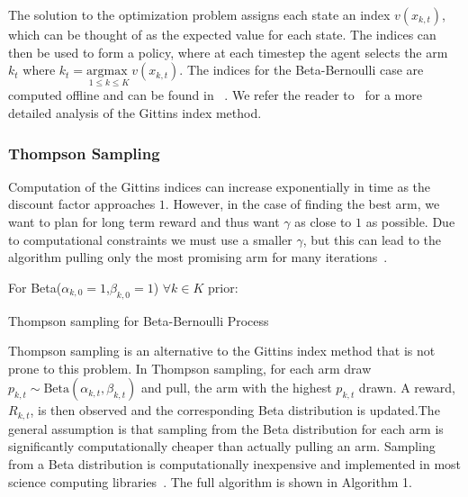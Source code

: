 \documentclass[10pt, conference]{ieeeconf}      %
\begin{document}
The solution to the optimization problem assigns each state an index $v(x_{k,t})$, which can be thought of as the expected value for each state. 
The indices can then be used to form a policy, where at each timestep the agent selects the arm $k_t$ where $k_t= \underset{1 \leq k \leq K}{\mbox{argmax }} v(x_{k,t})$.  The indices for the Beta-Bernoulli case are computed offline and can be found in ~\cite{gittins2011multi}.
We refer the reader to~\cite{gittins2011multi} for a more detailed analysis of the Gittins index method.
 

\subsubsection{Thompson Sampling}
Computation of the Gittins indices can increase exponentially in time as the discount factor approaches $1$.
However, in the case of finding the best arm, we want to plan for long term reward and thus want $\gamma$ as close to $1$ as possible.
Due to computational constraints we must use a smaller $\gamma$, but this can lead to the algorithm pulling only the most promising arm for many iterations~\cite{kelly1981multi}.

\begin{algorithm}
 For Beta($\alpha_{k,0}=1$,$\beta_{k,0}=1$) $\forall k \in K$ prior: \\
 \caption{Thompson sampling for Beta-Bernoulli Process}
\end{algorithm}

Thompson sampling is an alternative to the Gittins index method that is not prone to this problem. 
In Thompson sampling, for each arm draw $p_{k,t} \sim \mbox{Beta}(\alpha_{k,t},\beta_{k,t})$ and pull, the arm with the highest $p_{k,t}$ drawn.
A reward, $R_{k,t}$, is then observed and the corresponding Beta distribution is updated.The general assumption is that sampling from the Beta distribution for each arm is significantly computationally cheaper than actually pulling an arm. Sampling from a Beta distribution is computationally inexpensive and implemented  in most science computing libraries~\cite{MATLAB:2010}. The full algorithm is shown in Algorithm 1.
\end{document}
